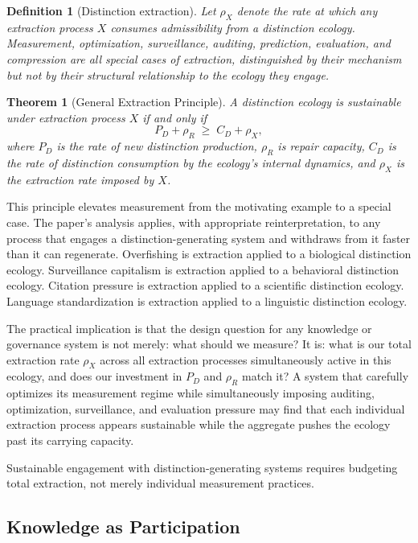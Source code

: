 \documentclass[12pt, a4paper]{article}
\theoremstyle{flyxion}
\newtheorem{theorem}{Theorem}
\newtheorem{definition}{Definition}
\newcommand{\rhoR}{\rho_{R}}
\begin{document}
\begin{definition}[Distinction extraction]
Let $\rho_X$ denote the rate at which any extraction process $X$ consumes admissibility from a distinction ecology. Measurement, optimization, surveillance, auditing, prediction, evaluation, and compression are all special cases of extraction, distinguished by their mechanism but not by their structural relationship to the ecology they engage.
\end{definition}

\begin{theorem}[General Extraction Principle]
A distinction ecology is sustainable under extraction process $X$ if and only if
\[
  P_D + \rhoR \;\geq\; C_D + \rho_X,
\]
where $P_D$ is the rate of new distinction production, $\rhoR$ is repair capacity, $C_D$ is the rate of distinction consumption by the ecology's internal dynamics, and $\rho_X$ is the extraction rate imposed by $X$.
\end{theorem}

This principle elevates measurement from the motivating example to a special case. The paper's analysis applies, with appropriate reinterpretation, to any process that engages a distinction-generating system and withdraws from it faster than it can regenerate. Overfishing is extraction applied to a biological distinction ecology. Surveillance capitalism is extraction applied to a behavioral distinction ecology. Citation pressure is extraction applied to a scientific distinction ecology. Language standardization is extraction applied to a linguistic distinction ecology.

The practical implication is that the design question for any knowledge or governance system is not merely: what should we measure? It is: what is our total extraction rate $\rho_X$ across all extraction processes simultaneously active in this ecology, and does our investment in $P_D$ and $\rhoR$ match it? A system that carefully optimizes its measurement regime while simultaneously imposing auditing, optimization, surveillance, and evaluation pressure may find that each individual extraction process appears sustainable while the aggregate pushes the ecology past its carrying capacity.

Sustainable engagement with distinction-generating systems requires budgeting total extraction, not merely individual measurement practices.

\subsection*{Knowledge as Participation}
\end{document}
